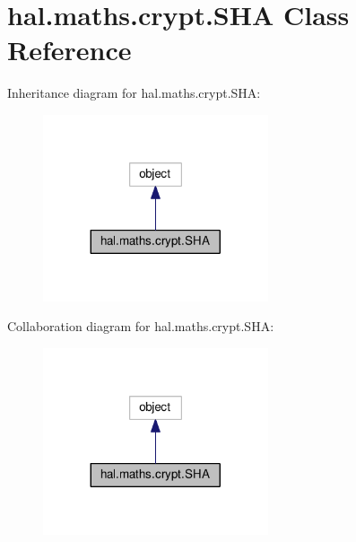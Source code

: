 \hypertarget{classhal_1_1maths_1_1crypt_1_1_s_h_a}{}\section{hal.\+maths.\+crypt.\+S\+HA Class Reference}
\label{classhal_1_1maths_1_1crypt_1_1_s_h_a}


Inheritance diagram for hal.\+maths.\+crypt.\+S\+HA\+:\nopagebreak
\begin{figure}[H]
\begin{center}
\leavevmode
\includegraphics[width=188pt]{classhal_1_1maths_1_1crypt_1_1_s_h_a__inherit__graph}
\end{center}
\end{figure}


Collaboration diagram for hal.\+maths.\+crypt.\+S\+HA\+:\nopagebreak
\begin{figure}[H]
\begin{center}
\leavevmode
\includegraphics[width=188pt]{classhal_1_1maths_1_1crypt_1_1_s_h_a__coll__graph}
\end{center}
\end{figure}
